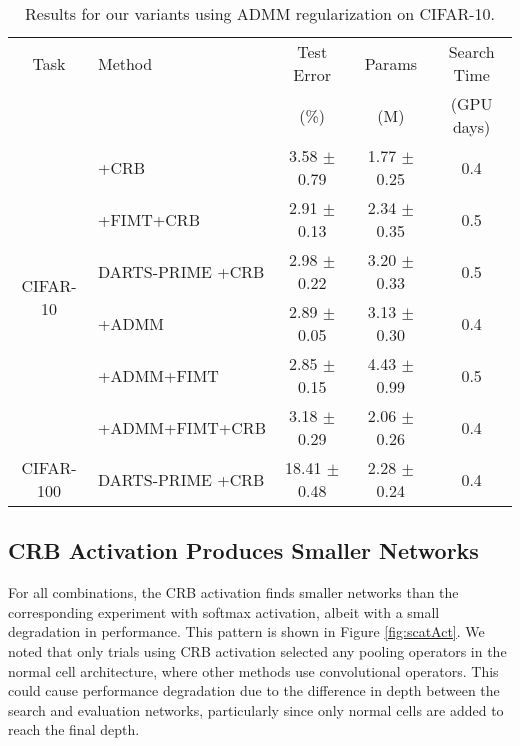 \documentclass[letterpaper]{article} \usepackage{aaai22}  \usepackage{times}  \usepackage{helvet}  \usepackage{courier}  \usepackage[hyphens]{url}  \usepackage{graphicx} \urlstyle{rm} \def\UrlFont{\rm}  \usepackage{natbib}  \usepackage{caption} \DeclareCaptionStyle{ruled}{labelfont=normalfont,labelsep=colon,strut=off} \frenchspacing  \setlength{\pdfpagewidth}{8.5in}  \setlength{\pdfpageheight}{11in}  \usepackage{algorithm}
\begin{document}
\begin{table*}[tb!]
\centering \small
\begin{tabular}{@{}clccc@{}}
\toprule
Task & Method  &  Test Error \hspace{1mm} &  \hspace{1mm} Params \hspace{1mm} & \hspace{1mm} Search Time \\
 & &  (\%) \hspace{1mm} &  \hspace{1mm} (M) \hspace{1mm} & \hspace{1mm} (GPU days)
\\  \midrule
\multirow{6}{*}{CIFAR-10} 
& +CRB & 3.58 $\pm$ 0.79 & 1.77 $\pm$ 0.25 & 0.4 \\
& +FIMT+CRB & 2.91 $\pm$ 0.13 & 2.34 $\pm$ 0.35 & 0.5 \\
& DARTS-PRIME +CRB & 2.98 $\pm$ 0.22 & 3.20 $\pm$ 0.33 & 0.5 \\
& +ADMM & 2.89 $\pm$ 0.05 & 3.13 $\pm$ 0.30 & 0.4 \\
& +ADMM+FIMT & 2.85 $\pm$ 0.15 & 4.43 $\pm$ 0.99 & 0.5 \\
& +ADMM+FIMT+CRB & 3.18 $\pm$ 0.29 & 2.06 $\pm$ 0.26 & 0.4 \\
\midrule\midrule
\multirow{1}{*}{CIFAR-100} & DARTS-PRIME +CRB & 18.41 $\pm$ 0.48 & 2.28 $\pm$ 0.24 & 0.4 \\
\bottomrule
\end{tabular}
\caption{Results for our variants using ADMM regularization on CIFAR-10.
}
\label{table:cares}
\end{table*}

\subsection{CRB Activation Produces Smaller Networks}

For all combinations, the CRB activation finds smaller networks than the corresponding experiment with softmax activation, albeit with a small degradation in performance. This pattern is shown in Figure \ref{fig:scatAct}. We noted that only trials using CRB activation selected any pooling operators in the normal cell architecture, where other methods use convolutional operators. This could cause performance degradation due to the difference in depth between the search and evaluation networks, particularly since only normal cells are added to reach the final depth. 
\end{document}
